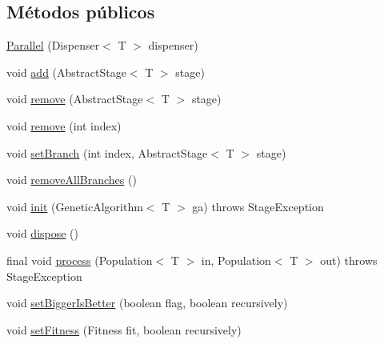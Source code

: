 \subsection*{Métodos públicos}
\begin{DoxyCompactItemize}
\item 
\hyperlink{classjenes_1_1stage_1_1_parallel_3_01_t_01extends_01_chromosome_01_4_a933c7a845f624f290f27c9921e6e8ca9}{Parallel} (Dispenser$<$ T $>$ dispenser)
\item 
void \hyperlink{classjenes_1_1stage_1_1_parallel_3_01_t_01extends_01_chromosome_01_4_afe3cf6bd36f7e0f7246cbf609d9cbdf2}{add} (Abstract\-Stage$<$ T $>$ stage)
\item 
void \hyperlink{classjenes_1_1stage_1_1_parallel_3_01_t_01extends_01_chromosome_01_4_adb15ae336a8829eb0a8f984eb7aac3ca}{remove} (Abstract\-Stage$<$ T $>$ stage)
\item 
void \hyperlink{classjenes_1_1stage_1_1_parallel_3_01_t_01extends_01_chromosome_01_4_acf777ee17edc34cb81d2d0fc145cffc4}{remove} (int index)
\item 
void \hyperlink{classjenes_1_1stage_1_1_parallel_3_01_t_01extends_01_chromosome_01_4_a115d20da27789c0a053ed7e161838477}{set\-Branch} (int index, Abstract\-Stage$<$ T $>$ stage)
\item 
void \hyperlink{classjenes_1_1stage_1_1_parallel_3_01_t_01extends_01_chromosome_01_4_acc2efb924520eb73061928e39580202c}{remove\-All\-Branches} ()
\item 
void \hyperlink{classjenes_1_1stage_1_1_parallel_3_01_t_01extends_01_chromosome_01_4_a75d99b7406d735b297e6192b2ac130e9}{init} (Genetic\-Algorithm$<$ T $>$ ga)  throws Stage\-Exception 
\item 
void \hyperlink{classjenes_1_1stage_1_1_parallel_3_01_t_01extends_01_chromosome_01_4_a67831e08edd3b98bf0d81778cf067aeb}{dispose} ()
\item 
final void \hyperlink{classjenes_1_1stage_1_1_parallel_3_01_t_01extends_01_chromosome_01_4_a504ed9a0dddbfd46a9bebd4a38dba964}{process} (Population$<$ T $>$ in, Population$<$ T $>$ out)  throws Stage\-Exception 
\item 
void \hyperlink{classjenes_1_1stage_1_1_parallel_3_01_t_01extends_01_chromosome_01_4_ae8ea18096e341f41bf44c56ba1628a99}{set\-Bigger\-Is\-Better} (boolean flag, boolean recursively)
\item 
void \hyperlink{classjenes_1_1stage_1_1_parallel_3_01_t_01extends_01_chromosome_01_4_ae50a3b3fae5a0b2c3465a0bae243263b}{set\-Fitness} (Fitness fit, boolean recursively)
\end{DoxyCompactItemize}
